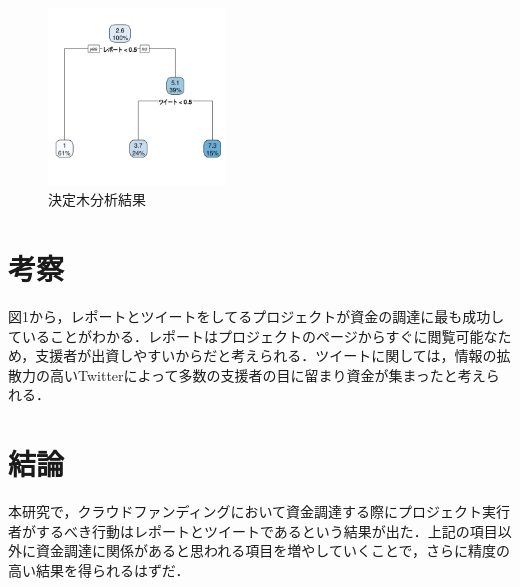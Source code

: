 \documentclass[uplatex,twocolumn,dvipdfmx]{jsarticle}
\begin{document}
\begin{figure}[h]
\centering
\includegraphics[width=4.7cm,clip]{ket.pdf}
\caption{決定木分析結果}\label{サンプル図}
\end{figure}

\section{考察}
図1から，レポートとツイートをしてるプロジェクトが資金の調達に最も成功していることがわかる．レポートはプロジェクトのページからすぐに閲覧可能なため，支援者が出資しやすいからだと考えられる．ツイートに関しては，情報の拡散力の高いTwitterによって多数の支援者の目に留まり資金が集まったと考えられる．


\section{結論}
本研究で，クラウドファンディングにおいて資金調達する際にプロジェクト実行者がするべき行動はレポートとツイートであるという結果が出た．上記の項目以外に資金調達に関係があると思われる項目を増やしていくことで，さらに精度の高い結果を得られるはずだ．


\end{document}
